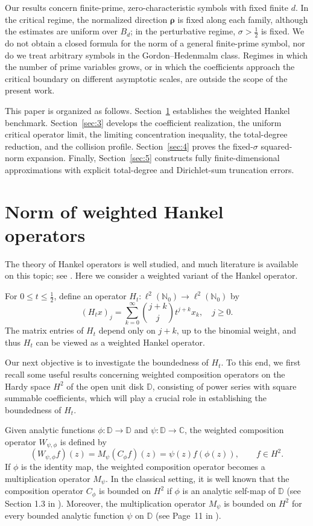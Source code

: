 \documentclass[12pt, reqno]{amsart}
\numberwithin{equation}{section}
\begin{document}
Our results concern finite-prime, zero-characteristic symbols with fixed
finite $d$. In the critical regime, the normalized direction
$\boldsymbol\rho$ is fixed along each family, although the estimates are
uniform over $B_d$; in the perturbative regime, $\sigma>\frac12$ is
fixed. We do not obtain a closed formula for the norm of a general
finite-prime symbol, nor do we treat arbitrary symbols in the
Gordon--Hedenmalm class. Regimes in which the number of prime variables
grows, or in which the coefficients approach the critical boundary on
different asymptotic scales, are outside the scope of the present work.

This paper is organized as follows. Section~\ref{Sec:2} establishes the
weighted Hankel benchmark. Section~\ref{sec:3} develops the coefficient
realization, the uniform critical operator limit, the limiting
concentration inequality, the total-degree reduction, and the collision
profile. Section~\ref{sec:4} proves the fixed-\(\sigma\) squared-norm
expansion. Finally, Section~\ref{sec:5} constructs fully finite-dimensional
approximations with explicit total-degree and Dirichlet-sum truncation
errors.


\section{Norm of weighted Hankel operators} \label{Sec:2}
The theory of Hankel operators is well studied, and much literature is available on this topic; see \cite{vv}. Here we consider a weighted variant of the Hankel operator.

For $0 \leq t \leq \tfrac{1}{2}$, define an operator $H_t : \ell^2(\mathbb{N}_0) \to \ell^2(\mathbb{N}_0)$ by
\[
(H_t x)_j = \sum_{k=0}^{\infty} \binom{j+k}{j} t^{j+k} x_k, \quad j \geq 0.
\]
The matrix entries of $H_t$ depend only on $j+k$, up to the binomial weight, and thus $H_t$ can be viewed as a weighted Hankel operator.


Our next objective is to investigate the boundedness of $H_t$. To this end, we first recall some useful results concerning weighted composition operators on the Hardy space $H^2$ of the open unit disk $\mathbb{D}$, consisting  of power series with square summable coefficients, which will play a crucial role in establishing the boundedness of $H_t$.


Given analytic functions $\phi : \mathbb{D} \to \mathbb{D}$ and $\psi : \mathbb{D} \to \mathbb{C}$, the weighted composition operator $W_{\psi,\phi}$ is defined by
\[
(W_{\psi,\phi}f)(z) = M_{\psi}(C_{\phi}f)(z)=\psi(z) f(\phi(z)), \qquad f \in H^2.
\]
If $\phi$ is the identity map, the weighted composition operator becomes a multiplication operator $M_{\psi}.$
In the classical setting, it is well known that the composition operator $C_\phi$ is bounded on $H^2$ if  $\phi$ is an analytic self-map of $\mathbb{D}$ (see Section 1.3 in \cite{shap}). Moreover, the multiplication operator $M_\psi$ is bounded on $H^2$ for every bounded analytic function $\psi$ on $\mathbb{D}$ (see Page~11 in \cite{shap}).
\end{document}
